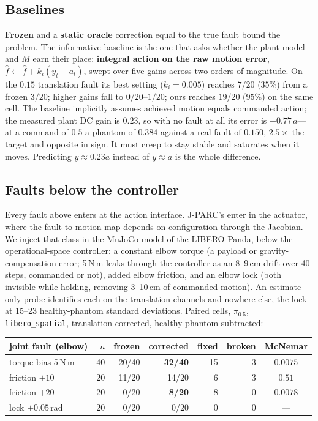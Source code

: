 \documentclass{article}
\newcommand{\fhat}{\hat{f}}
\newcommand{\code}[1]{\texttt{\small #1}}
\begin{document}
\subsection{Baselines}
\label{sec:baselines}

\textbf{Frozen} and a \textbf{static oracle} correction equal to the true fault bound the
problem. The informative baseline is the one that asks whether the plant model and $M$ earn
their place: \textbf{integral action on the raw motion error}, $\fhat \leftarrow \fhat +
k_i(y_t - a_t)$, swept over five gains across two orders of magnitude. On the $0.15$
translation fault its best setting ($k_i=0.005$) reaches $7/20$ ($35\%$) from a frozen
$3/20$; higher gains fall to $0/20$--$1/20$; ours reaches $19/20$ ($95\%$) on the same
cell. The baseline implicitly assumes achieved motion equals commanded action; the measured plant
DC gain is $0.23$, so with no fault at all its error is $-0.77\,a$---at a command of $0.5$
a phantom of $0.384$ against a real fault of $0.150$, $2.5\times$ the target and opposite in
sign. It must creep to stay stable and saturates when it moves. Predicting $y\approx0.23a$
instead of $y\approx a$ is the whole difference.

\subsection{Faults below the controller}
\label{sec:joint}

Every fault above enters at the action interface. J-PARC's enter in the actuator, where
the fault-to-motion map depends on configuration through the Jacobian. We inject that
class in the MuJoCo model of the LIBERO Panda, below the operational-space controller: a
constant elbow torque (a payload or gravity-compensation error; 5\,N\,m leaks through the
controller as an 8--9\,cm drift over 40 steps, commanded or not), added elbow friction, and
an elbow lock (both invisible while holding, removing 3--10\,cm of commanded motion). An
estimate-only probe identifies each on the translation channels and nowhere else, the lock
at 15--23 healthy-phantom standard deviations. Paired cells, $\pi_{0.5}$,
\code{libero\_spatial}, translation corrected, healthy phantom subtracted:

\begin{center}\small
\begin{tabular}{lrrrrrc}
\toprule
joint fault (elbow) & $n$ & frozen & corrected & fixed & broken & McNemar \\
\midrule
torque bias 5\,N\,m & 40 & 20/40 & \textbf{32/40} & 15 & 3 & $0.0075$ \\
friction $+10$ & 20 & 11/20 & 14/20 & 6 & 3 & $0.51$ \\
friction $+20$ & 20 & 0/20 & \textbf{8/20} & 8 & 0 & $0.0078$ \\
lock $\pm0.05$\,rad & 20 & 0/20 & 0/20 & 0 & 0 & --- \\
\bottomrule
\end{tabular}
\end{center}
\end{document}
